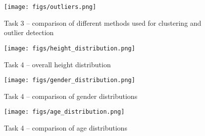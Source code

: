\documentclass[a4paper,10pt]{article}\setlength{\textheight}{10in}\setlength{\textwidth}{6.5in}\setlength{\topmargin}{-0.125in}\setlength{\oddsidemargin}{-.2in}\setlength{\evensidemargin}{-.2in}\setlength{\headsep}{0.2in}\setlength{\footskip}{0pt}\usepackage{amsmath}\usepackage{fancyhdr}\usepackage{enumitem}\usepackage{hyperref}\usepackage{xcolor}\usepackage{graphicx}\pagestyle{fancy}
\begin{document}
\begin{figure}
\begin{adjustwidth}{-0.87cm}{}
    \centering
    \texttt{[image: figs/outliers.png]}
    \caption{Task 3 -- comparison of different methods used for clustering and outlier detection}
    \label{fig:outliers}
\end{adjustwidth}
\end{figure}

\begin{figure}
    \centering
    \texttt{[image: figs/height\_distribution.png]}
    \caption{Task 4 -- overall height distribution}
    \label{fig:height_dis}
\end{figure}

\begin{figure}
\begin{adjustwidth}{-0.87cm}{}
    \centering
    \texttt{[image: figs/gender\_distribution.png]}
    \caption{Task 4 -- comparison of gender distributions}
    \label{fig:gender_dis}
\end{adjustwidth}
\end{figure}

\begin{figure}
\begin{adjustwidth}{-0.87cm}{}
    \centering
    \texttt{[image: figs/age\_distribution.png]}
    \caption{Task 4 -- comparison of age distributions}
    \label{fig:age_distrib}
\end{adjustwidth}
\end{figure}
\end{document}
